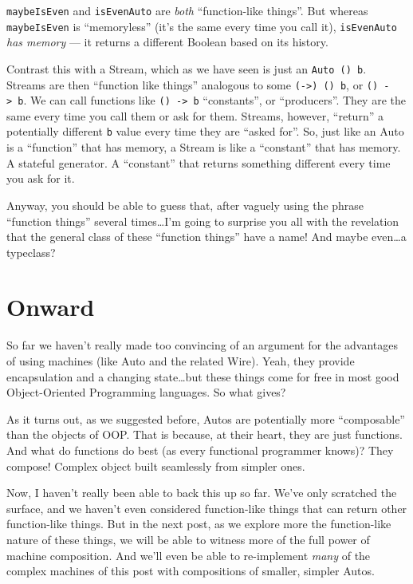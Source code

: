 \documentclass[]{article}
\begin{document}
\texttt{maybeIsEven} and \texttt{isEvenAuto} are \emph{both} ``function-like
things''. But whereas \texttt{maybeIsEven} is ``memoryless'' (it's the same
every time you call it), \texttt{isEvenAuto} \emph{has memory} --- it returns a
different Boolean based on its history.

Contrast this with a Stream, which as we have seen is just an
\texttt{Auto\ ()\ b}. Streams are then ``function like things'' analogous to
some \texttt{(-\textgreater{})\ ()\ b}, or \texttt{()\ -\textgreater{}\ b}. We
can call functions like \texttt{()\ -\textgreater{}\ b} ``constants'', or
``producers''. They are the same every time you call them or ask for them.
Streams, however, ``return'' a potentially different \texttt{b} value every time
they are ``asked for''. So, just like an Auto is a ``function'' that has memory,
a Stream is like a ``constant'' that has memory. A stateful generator. A
``constant'' that returns something different every time you ask for it.

Anyway, you should be able to guess that, after vaguely using the phrase
``function things'' several times\ldots I'm going to surprise you all with the
revelation that the general class of these ``function things'' have a name! And
maybe even\ldots a typeclass?

\section{Onward}\label{onward}

So far we haven't really made too convincing of an argument for the advantages
of using machines (like Auto and the related Wire). Yeah, they provide
encapsulation and a changing state\ldots but these things come for free in most
good Object-Oriented Programming languages. So what gives?

As it turns out, as we suggested before, Autos are potentially more
``composable'' than the objects of OOP. That is because, at their heart, they
are just functions. And what do functions do best (as every functional
programmer knows)? They compose! Complex object built seamlessly from simpler
ones.

Now, I haven't really been able to back this up so far. We've only scratched the
surface, and we haven't even considered function-like things that can return
other function-like things. But in the next post, as we explore more the
function-like nature of these things, we will be able to witness more of the
full power of machine composition. And we'll even be able to re-implement
\emph{many} of the complex machines of this post with compositions of smaller,
simpler Autos.
\end{document}
